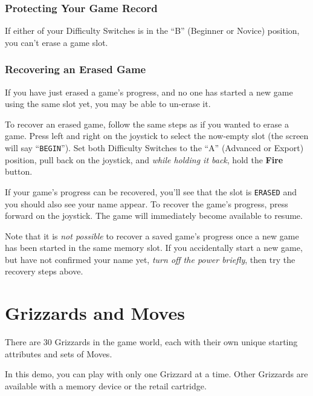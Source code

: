 \documentclass[10pt,twocolumn,openany,article]{memoir}
\begin{document}
\subsection{Protecting Your Game Record}

If  either of  your Difficulty  Switches is  in the  ``B'' (Beginner  or
Novice) position, you can't erase a game slot.

\ifdefined\DEMO\else

\subsection{Recovering an Erased Game}

If you have just erased a game's  progress, and no one has started a new
game using the same slot yet, you may be able to un-erase it.

To recover  an erased game,  follow the same steps  as if you  wanted to
erase  a game.  Press  left and  right  on the  joystick  to select  the
now-empty  slot  (the  screen  will say  ``\texttt{BEGIN}'').  Set  both
Difficulty Switches  to the  ``A'' (Advanced  or Export)  position, pull
back  on  the joystick,  and  \emph{while  holding  it back},  hold  the
\textbf{Fire} button.

If your  game's progress can be  recovered, you'll see that  the slot is
\texttt{ERASED} and you should also see your name appear. To recover the
game's progress, press forward on the joystick. The game will immediately
become available to resume.

Note that it  is \emph{not possible} to recover a  saved game's progress
once  a new  game has  been  started in  the  same memory  slot. If  you
accidentally start  a new game,  but have  not confirmed your  name yet,
\emph{turn off the power briefly}, then try the recovery steps above.

\fi

\fi %

\columnbreak
\chapter{Grizzards and Moves}
\label{ch:Grizzards}

There are  30 Grizzards in  the game world,  each with their  own unique
starting attributes and sets of Moves.

\ifdefined\NOSAVE

In  this  demo,  you  can  play  with  only  one  Grizzard  at  a  time.
Other   Grizzards  are   available   with  a   memory   device  or   the
retail cartridge.
\end{document}
